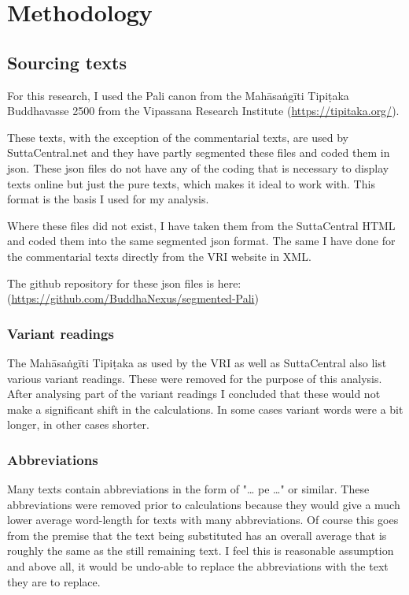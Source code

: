 \section{Methodology}
\subsection{Sourcing texts}
For this research, I used the Pali canon from the Mahāsaṅgīti Tipiṭaka Buddhavasse 2500 from the Vipassana Research Institute (\url{https://tipitaka.org/}).

These texts, with the exception of the commentarial texts, are used by SuttaCentral.net and they have partly segmented these files and coded them in json. These json files do not have any of the coding that is necessary to display texts online but just the pure texts, which makes it ideal to work with. This format is the basis I used for my analysis.

Where these files did not exist, I have taken them from the SuttaCentral HTML and coded them into the same segmented json format. The same I have done for the commentarial texts directly from the VRI website in XML.

The github repository for these json files is here: (\url{https://github.com/BuddhaNexus/segmented-Pali})

\subsubsection{Variant readings}
The Mahāsaṅgīti Tipiṭaka as used by the VRI as well as SuttaCentral also list various variant readings. These were removed for the purpose of this analysis. After analysing part of the variant readings I concluded that these would not make a significant shift in the calculations. In some cases variant words were a bit longer, in other cases shorter.

\subsubsection{Abbreviations}
Many texts contain abbreviations in the form of "… pe …" or similar. These abbreviations were removed prior to calculations because they would give a much lower average word-length for texts with many abbreviations. Of course this goes from the premise that the text being substituted has an overall average that is roughly the same as the still remaining text. I feel this is reasonable assumption and above all, it would be undo-able to replace the abbreviations with the text they are to replace.

